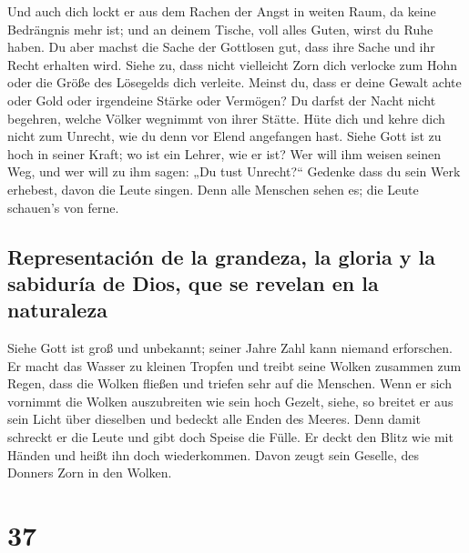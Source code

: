  Und auch dich lockt er aus dem Rachen der Angst in
weiten Raum, da keine Bedrängnis mehr ist; und an deinem Tische, voll
alles Guten, wirst du Ruhe haben.  Du aber machst die
Sache der Gottlosen gut, dass ihre Sache und ihr Recht erhalten wird.
 Siehe zu, dass nicht vielleicht Zorn dich verlocke zum
Hohn oder die Größe des Lösegelds dich verleite.  Meinst
du, dass er deine Gewalt achte oder Gold oder irgendeine Stärke oder
Vermögen?  Du darfst der Nacht nicht begehren, welche
Völker wegnimmt von ihrer Stätte.  Hüte dich und kehre
dich nicht zum Unrecht, wie du denn vor Elend angefangen hast.
 Siehe Gott ist zu hoch in seiner Kraft; wo ist ein
Lehrer, wie er ist?  Wer will ihm weisen seinen Weg, und
wer will zu ihm sagen: „Du tust Unrecht?{}``  Gedenke
dass du sein Werk erhebest, davon die Leute singen.  Denn
alle Menschen sehen es; die Leute schauen's von ferne.

\hypertarget{representaciuxf3n-de-la-grandeza-la-gloria-y-la-sabiduruxeda-de-dios-que-se-revelan-en-la-naturaleza}{%
\subsection{Representación de la grandeza, la gloria y la sabiduría de
Dios, que se revelan en la
naturaleza}\label{representaciuxf3n-de-la-grandeza-la-gloria-y-la-sabiduruxeda-de-dios-que-se-revelan-en-la-naturaleza}}

 Siehe Gott ist groß und unbekannt; seiner Jahre Zahl
kann niemand erforschen.  Er macht das Wasser zu kleinen
Tropfen und treibt seine Wolken zusammen zum Regen,  dass
die Wolken fließen und triefen sehr auf die Menschen. 
Wenn er sich vornimmt die Wolken auszubreiten wie sein hoch Gezelt,
 siehe, so breitet er aus sein Licht über dieselben und
bedeckt alle Enden des Meeres.  Denn damit schreckt er
die Leute und gibt doch Speise die Fülle.  Er deckt den
Blitz wie mit Händen und heißt ihn doch wiederkommen. 
Davon zeugt sein Geselle, des Donners Zorn in den Wolken.

\hypertarget{section-36}{%
\section{37}\label{section-36}}

